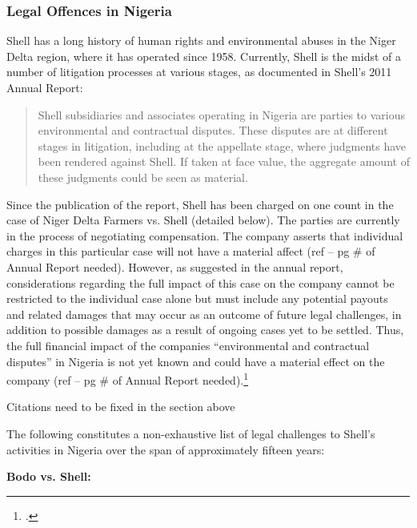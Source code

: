 	\subsubsection{Legal Offences in Nigeria}



Shell has a long history of human rights and environmental abuses in the Niger Delta region, where it has operated since 1958.
Currently, Shell is the midst of a number of litigation processes at various stages, as documented in Shell's 2011 Annual Report:
\begin{quote}
Shell subsidiaries and associates operating in Nigeria are parties to various environmental and contractual disputes.
These disputes are at different stages in litigation, including at the appellate stage, where judgments have been rendered against Shell. 
If taken at face value, the aggregate amount of these judgments could be seen as material.
\end{quote}
Since the publication of the report, Shell has been charged on one count in the case of Niger Delta Farmers vs. Shell (detailed below). 
The parties are currently in the process of negotiating compensation. 
The company asserts that individual charges in this particular case will not have a material affect (ref – pg \# of Annual Report needed). 
However, as suggested in the annual report, considerations regarding the full impact of this case on the company cannot be restricted to the individual case alone but must include any potential payouts and related damages that may occur as an outcome of future legal challenges, in addition to possible damages as a result of ongoing cases yet to be settled. 
Thus, the full financial impact of the companies ``environmental and contractual disputes'' in Nigeria is not yet known and could have a material effect on the company (ref – pg \# of Annual Report needed).\footcite[][p. 139]{Shell_2011}



\begin{vcom}
	Citations need to be fixed in the section above
\end{vcom}



The following constitutes a non-exhaustive list of legal challenges to Shell's activities in Nigeria over the span of approximately fifteen years:



\textbf{Bodo vs. Shell:}



